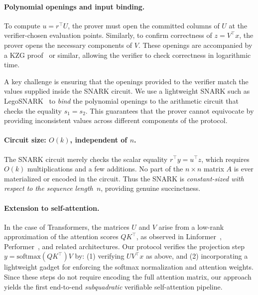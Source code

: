 \documentclass[11pt]{article}
\begin{document}
\vspace{0.7em}
\paragraph{Polynomial openings and input binding.}
To compute $u = r^\top U$, the prover must open the committed columns 
of $U$ at the verifier-chosen evaluation points.
Similarly, to confirm correctness of $z = V^\top x$, 
the prover opens the necessary components of $V$.
These openings are accompanied by a KZG proof~\cite{kate2010polynomial} or similar, 
allowing the verifier to check correctness in logarithmic time.

A key challenge is ensuring that the openings provided to the verifier 
match the values supplied inside the SNARK circuit.  
We use a lightweight SNARK such as LegoSNARK~\cite{campanelli2019legosnark} to 
\emph{bind} the polynomial openings to the arithmetic circuit that checks 
the equality $s_1 = s_2$.
This guarantees that the prover cannot equivocate by providing 
inconsistent values across different components of the protocol.

\vspace{0.7em}
\paragraph{Circuit size: $O(k)$, independent of $n$.}
The SNARK circuit merely checks the scalar equality 
$r^\top y = u^\top z$, which requires $O(k)$ multiplications and 
a few additions.
No part of the $n \times n$ matrix $A$ is ever materialized or encoded 
in the circuit.
Thus the SNARK is \emph{constant-sized with respect to the sequence 
length~$n$}, providing genuine succinctness.

\vspace{0.7em}
\paragraph{Extension to self-attention.}
In the case of Transformers, the matrices $U$ and $V$ arise from 
a low-rank approximation of the attention scores $QK^\top$, as observed 
in Linformer~\cite{wang2020linformer}, Performer~\cite{choromanski2021performer}, 
and related architectures.
Our protocol verifies the projection step 
$y = \mathrm{softmax}(QK^\top) V$ by:
(1) verifying $U V^\top x$ as above, and  
(2) incorporating a lightweight gadget for enforcing the softmax 
normalization and attention weights.
Since these steps do not require encoding the full attention matrix, 
our approach yields the first end-to-end \emph{subquadratic} 
verifiable self-attention pipeline.
\end{document}

